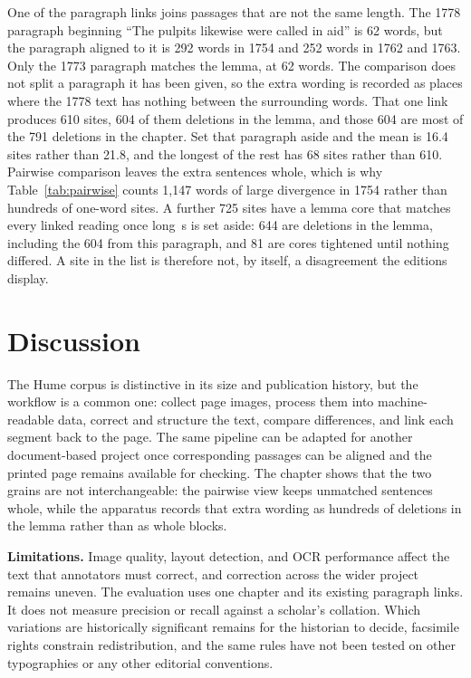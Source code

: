 \documentclass[sigconf,natbib,anonymous]{acmart}
\begin{document}
One of the paragraph links joins passages that are not the same length.
The 1778 paragraph beginning ``The pulpits likewise were called in aid'' is 62 words, but the paragraph aligned to it is 292 words in 1754 and 252 words in 1762 and 1763.
Only the 1773 paragraph matches the lemma, at 62 words.
The comparison does not split a paragraph it has been given, so the extra wording is recorded as places where the 1778 text has nothing between the surrounding words.
That one link produces 610 sites, 604 of them deletions in the lemma, and those 604 are most of the 791 deletions in the chapter.
Set that paragraph aside and the mean is 16.4 sites rather than 21.8, and the longest of the rest has 68 sites rather than 610.
Pairwise comparison leaves the extra sentences whole, which is why Table~\ref{tab:pairwise} counts 1,147 words of large divergence in 1754 rather than hundreds of one-word sites.
A further 725 sites have a lemma core that matches every linked reading once long~s is set aside: 644 are deletions in the lemma, including the 604 from this paragraph, and 81 are cores tightened until nothing differed.
A site in the list is therefore not, by itself, a disagreement the editions display.

\section{Discussion}

The Hume corpus is distinctive in its size and publication history, but the workflow is a common one: collect page images, process them into machine-readable data, correct and structure the text, compare differences, and link each segment back to the page.
The same pipeline can be adapted for another document-based project once corresponding passages can be aligned and the printed page remains available for checking.
The chapter shows that the two grains are not interchangeable: the pairwise view keeps unmatched sentences whole, while the apparatus records that extra wording as hundreds of deletions in the lemma rather than as whole blocks.

\textbf{Limitations.}
Image quality, layout detection, and OCR performance affect the text that annotators must correct, and correction across the wider project remains uneven.
The evaluation uses one chapter and its existing paragraph links.
It does not measure precision or recall against a scholar's collation.
Which variations are historically significant remains for the historian to decide, facsimile rights constrain redistribution, and the same rules have not been tested on other typographies or any other editorial conventions.
\end{document}
